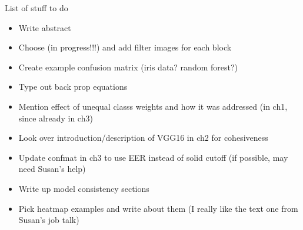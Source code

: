 
List of stuff to do

\begin{itemize}
\item Write abstract
\item Choose (in progress!!!) and add filter images for each block
\item Create example confusion matrix (iris data? random forest?)
\item Type out back prop equations
\item Mention effect of unequal classs weights and how it was addressed (in ch1, since already in ch3)
\item Look over introduction/description of VGG16 in ch2 for cohesiveness
\item Update confmat in ch3 to use EER instead of solid cutoff (if possible, may need Susan's help)
\item Write up model consistency sections
\item Pick heatmap examples and write about them (I really like the text one from Susan's job talk)
\end{itemize}
